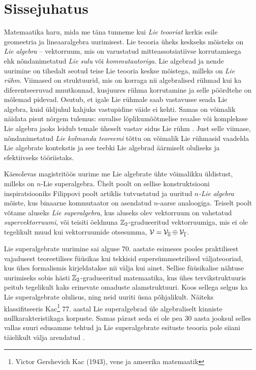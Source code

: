 
\section*{Sissejuhatus}

Matemaatika haru, mida me täna tunneme kui \emph{Lie teooriat} kerkis esile
geomeetria ja lineaaralgebra uurimisest. Lie teooria üheks keskseks mõisteks
on \emph{Lie algebra} -- vektorruum, mis on varustatud
mitteassotsiatiivse korrutamisega ehk nõndanimetatud \emph{Lie sulu} või
\emph{kommutaatoriga}.
Lie algebrad ja nende uurimine on tihedalt seotud teise Lie teooria keskse
mõistega, milleks on \emph{Lie rühm}. Viimased on
struktuurid, mis on korraga nii algebralised rühmad kui ka diferentseeruvad
muutkonnad, kusjuures rühma korrutamine ja selle pöördtehe on mõlemad
pidevad. Osutub, et igale Lie rühmale saab vastavusse seada Lie algebra, kuid
üldjuhul kahjuks vastupidine väide ei kehti. Samas on võimalik näidata
pisut nõrgem tulemus: suvalise lõplikumõõtmelise
reaalse või kompleksse Lie algebra jaoks leidub temale üheselt
vastav sidus Lie rühm \cite{kirillov2008introduction}. Just selle viimase,
nõndanimetatud \emph{Lie kolmanda teoreemi} tõttu on võimalik
Lie rühmasid vaadelda Lie algebrate kontekstis ja see teebki Lie algebrad
äärmiselt oluliseks ja efektiivseks tööriistaks.

Käesolevas magistritöös uurime me Lie algebrate ühte võimalikku üldistust,
milleks on $n$-Lie superalgebra. Ühelt poolt on sellise konstruktsiooni
inspiratsiooniks Filippovi poolt artiklis \cite{filippov1985} tutvustatud ja
uuritud \emph{$n$-Lie algebra} mõiste, kus binaarne kommutaator on asendatud
$n$-aarse analoogiga. Teiselt poolt võtame aluseks \emph{Lie superalgebra},
kus aluseks olev vektorruum on vahetatud \emph{supervektorruumi}, või
teisiti öeldnuna $\mathbb{Z}_2$-gradueeritud vektorruumiga, mis ei ole tegelikult
muud kui vektorruumide otsesumma,
$\mathcal{V} = \mathcal{V}_{\overline{0}} \oplus \mathcal{V}_{\overline{1}}$.

Lie superalgebrate uurimine sai alguse 70. aastate esimeses pooles praktilisest
vajadusest teoreetilises füüsikas kui tekkisid supersümmeetrilised
väljateooriad, kus ühes formalismis kirjeldatakse nii välja kui ainet.
Sellise füüsikalise nähtuse uurimiseks sobis hästi $\mathbb{Z}_2$-gradueeritud
matemaatika, kus ühes tervikstruktuuris peitub tegelikult kaks erinevate
omaduste alamstruktuuri. Koos sellega selgus ka Lie superalgebrate olulisus,
ning neid uuriti üsna põhjalikult. Näiteks klassifitseeris
Kac\footnote{Victor Gershevich Kac (1943), vene ja ameerika matemaatik}
77. aastal Lie superalgebrad üle algebraliselt kinniste nullkarakteristikaga
korpuste. Samas pärast seda ei ole pea 30 aasta jooksul selles vallas suuri
edusamme tehtud ja Lie superalgebrate esituste teooria pole siiani
täielikult välja arendatud \cite{musson2012lie}.


